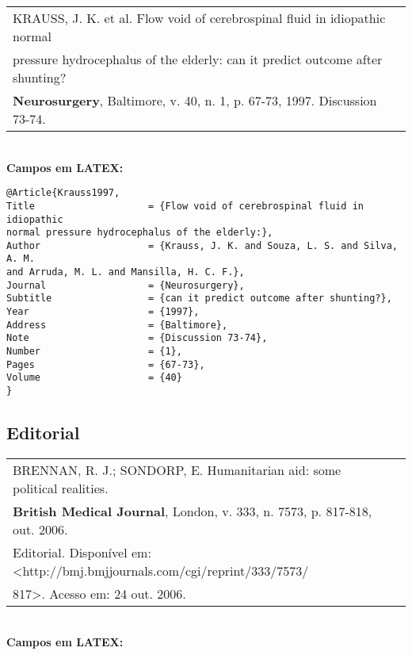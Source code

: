 \begin{tabular}{|l|c|} \hline
	KRAUSS, J. K. et al. Flow void of cerebrospinal fluid in idiopathic normal \\
	pressure hydrocephalus of the elderly: can it predict outcome after        
	shunting?                                                                  \\\textbf{Neurosurgery}, Baltimore, v. 40, n. 1, p. 67-73, 1997.
	Discussion 73-74.                                                          
	                                                                           \\\hline
\end{tabular} \\
	
\textbf{Campos em LATEX:} 
	
\begingroup
\fontsize{10pt}{12pt}\selectfont
\begin{verbatim}
@Article{Krauss1997,
Title                    = {Flow void of cerebrospinal fluid in idiopathic 
normal pressure hydrocephalus of the elderly:},
Author                   = {Krauss, J. K. and Souza, L. S. and Silva, A. M. 
and Arruda, M. L. and Mansilla, H. C. F.},
Journal                  = {Neurosurgery},
Subtitle                 = {can it predict outcome after shunting?},
Year                     = {1997},
Address                  = {Baltimore},
Note                     = {Discussion 73-74},
Number                   = {1},
Pages                    = {67-73},
Volume                   = {40}
}
\end{verbatim}
\endgroup
	
\subsection{Editorial} 
	
	
\begin{tabular}{|l|c|} \hline
	BRENNAN, R. J.; SONDORP, E. Humanitarian aid: some political realities. \\ \textbf{British Medical Journal}, London, v. 333, n. 7573, p. 817-818, out. 2006. \\Editorial. Disponível em: <http://bmj.bmjjournals.com/cgi/reprint/333/7573/\\817>. Acesso em: 24 out. 2006. \\\hline
\end{tabular} \\
	
\textbf{Campos em LATEX:} 
	
